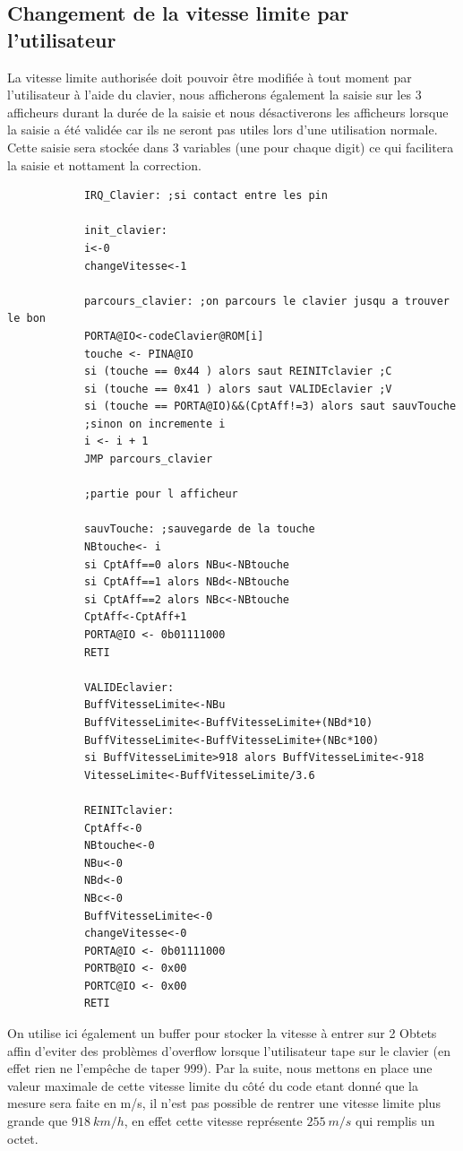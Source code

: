 \documentclass[a4paper, 12pt]{article}
\begin{document}
		\subsection{Changement de la vitesse limite par l'utilisateur}
		La vitesse limite authorisée doit pouvoir être modifiée à tout moment par l'utilisateur à l'aide du clavier, nous afficherons également la saisie sur les 3 afficheurs durant la durée de la saisie et nous désactiverons les afficheurs lorsque la saisie a été validée car ils ne seront pas utiles lors d'une utilisation normale. Cette saisie sera stockée dans 3 variables (une pour chaque digit) ce qui facilitera la saisie et nottament la correction.
		\begin{lstlisting}
			IRQ_Clavier: ;si contact entre les pin
			
			init_clavier:
			i<-0
			changeVitesse<-1
			
			parcours_clavier: ;on parcours le clavier jusqu a trouver le bon 
			PORTA@IO<-codeClavier@ROM[i]
			touche <- PINA@IO
			si (touche == 0x44 ) alors saut REINITclavier ;C
			si (touche == 0x41 ) alors saut VALIDEclavier ;V
			si (touche == PORTA@IO)&&(CptAff!=3) alors saut sauvTouche
			;sinon on incremente i
			i <- i + 1 
			JMP parcours_clavier
			
			;partie pour l afficheur 
			
			sauvTouche: ;sauvegarde de la touche 
			NBtouche<- i
			si CptAff==0 alors NBu<-NBtouche
			si CptAff==1 alors NBd<-NBtouche
			si CptAff==2 alors NBc<-NBtouche
			CptAff<-CptAff+1
			PORTA@IO <- 0b01111000
			RETI
			
			VALIDEclavier:
			BuffVitesseLimite<-NBu
			BuffVitesseLimite<-BuffVitesseLimite+(NBd*10)
			BuffVitesseLimite<-BuffVitesseLimite+(NBc*100)
			si BuffVitesseLimite>918 alors BuffVitesseLimite<-918
			VitesseLimite<-BuffVitesseLimite/3.6
			
			REINITclavier:
			CptAff<-0
			NBtouche<-0 
			NBu<-0
			NBd<-0
			NBc<-0
			BuffVitesseLimite<-0
			changeVitesse<-0
			PORTA@IO <- 0b01111000
			PORTB@IO <- 0x00
			PORTC@IO <- 0x00
			RETI
		\end{lstlisting}
		On utilise ici également un buffer pour stocker la vitesse à entrer sur 2 Obtets affin d'eviter des problèmes d'overflow lorsque l'utilisateur tape sur le clavier (en effet rien ne l'empêche de taper 999). Par la suite, nous mettons en place une valeur maximale de cette vitesse limite du côté du code etant donné que la mesure sera faite en m/s, il n'est pas possible de rentrer une vitesse limite plus grande que $918\ km/h$, en effet cette vitesse représente $255\ m/s$ qui remplis un octet.
		
\end{document}
